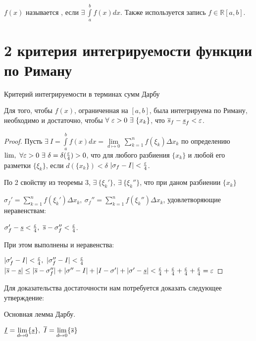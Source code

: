 \begin{opred}
$f(x)$ называется , если $\exists\ \int\limits^b_af(x)dx$. Также используется запись $f\in \mathbb{R}[a,b]$.
\end{opred}
\section{2 критерия интегрируемости функции по Риману}
\begin{theor}Критерий интегрируемости в терминах сумм Дарбу

Для того, чтобы $f(x)$, ограниченная на $[a,b]$, была интегрируема по Риману, необходимо и достаточно, чтобы $\forall\ \varepsilon>0\ \exists\ \{x_k\}$, что $\overline{s}_f-\underline{s}_f<\varepsilon$.
\end{theor}
\begin{proof}

Пусть $\exists\ I=\int\limits^b_af(x)dx=\underset{d\mapsto0}{\lim}\ \sum\limits^n_{k=1}f(\xi_k)\Delta x_k$ \then по определению $\lim,\ \forall \eps>0\ \exists\ \delta=\delta(\frac\eps4)>0$, что для любого разбиения $\{x_k\}$ и любой его разметки $\{\xi_k\}$, если $d(\{x_k\})<\delta$ \then $|\sigma_f-I|<\frac{\varepsilon}4$.

По 2 свойству из теоремы 3, $\exists\ \{\xi_k'\},\ \exists\ \{\xi_k''\}$, что при даном разбиении $\{x_k\}$

$\sigma_f'=\sum\limits^n_{k=1}f(\xi_k')\Delta x_k,\ \sigma_f''=\sum\limits^n_{k=1}f(\xi_k'')\Delta x_k$, удовлетворяющие неравенствам:

$\sigma_f'-\ns<\frac\eps4,\ \vs-\sigma_f''<\frac\eps4$.

При этом выполнены и неравенства:

$|\sigma_f'-I|<\frac\eps4,\ |\sigma_f''-I|<\frac\eps4$ \then $|\overline{s}-\underline{s}|\leq|\overline{s}-\sigma_f''|+|\sigma''-I|+|I-\sigma'|+|\sigma'-\underline{s}|<\frac{\varepsilon}4+\frac{\varepsilon}4+\frac{\varepsilon}4+\frac{\varepsilon}4=\varepsilon$
\end{proof}
Для доказательства достаточности нам потребуется доказать следующее утверждение:
\begin{lemma}Основная лемма Дарбу.

$\nis=\underset{d\mapsto0}{\lim}\{\ns\},\ \vis=\underset{d\mapsto0}{\lim}\{\vs\}$
\end{lemma}
